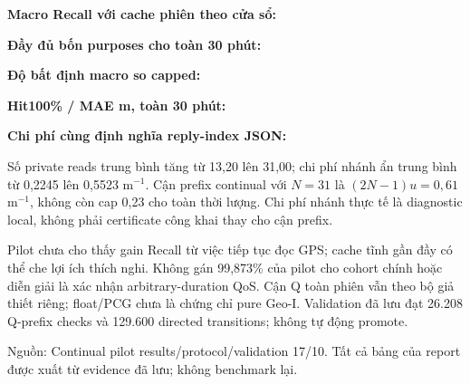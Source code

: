 \documentclass[10pt,a4paper]{article}
\newcommand{\source}[1]{\par{\footnotesize\color{gray}Nguồn: #1}\par}
\begin{document}
\textbf{Macro Recall với cache phiên theo cửa sổ:}
\begin{small}\end{small}
\textbf{Đầy đủ bốn purposes cho toàn 30 phút:}
\begin{small}\end{small}
\textbf{Độ bất định macro so capped:}
\begin{small}\end{small}
\textbf{Hit100\% / MAE m, toàn 30 phút:}
\begin{small}\end{small}
\textbf{Chi phí cùng định nghĩa reply-index JSON:}
\begin{small}\end{small}

Số private reads trung bình tăng từ 13,20 lên 31,00; chi phí nhánh ẩn trung bình từ 0,2245 lên 0,5523 m$^{-1}$.
Cận prefix continual với $N=31$ là $(2N-1)u=0{,}61$ m$^{-1}$, không còn cap 0,23 cho toàn thời lượng.
Chi phí nhánh thực tế là diagnostic local, không phải certificate công khai thay cho cận prefix.

Pilot chưa cho thấy gain Recall từ việc tiếp tục đọc GPS; cache tĩnh gần đầy có thể che lợi ích thích nghi.
Không gán 99,873\% của pilot cho cohort chính hoặc diễn giải là xác nhận arbitrary-duration QoS.
Cận Q toàn phiên vẫn theo bộ giả thiết riêng; float/PCG chưa là chứng chỉ pure Geo-I.
Validation đã lưu đạt 26.208 Q-prefix checks và 129.600 directed transitions; không tự động promote.

\source{Continual pilot results/protocol/validation 17/10. Tất cả bảng của report được xuất từ evidence đã lưu; không benchmark lại.}
\end{document}
